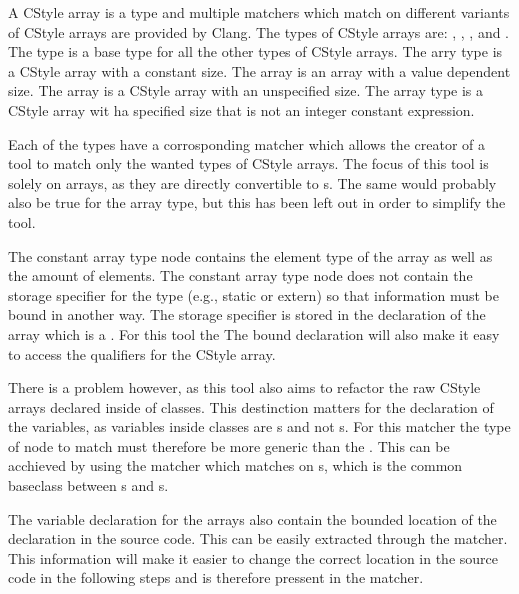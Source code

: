 A CStyle array is a type and multiple matchers which match on different variants of CStyle arrays are provided by Clang. The types of CStyle arrays are: , , ,  and . \\
The  type is a base type for all the other types of CStyle arrays. The  arry type is a CStyle array with a constant size. The  array is an array with a value dependent size. The  array is a CStyle array with an unspecified size. The  array type is a CStyle array wit ha specified size that is not an integer constant expression.

Each of the types have a corrosponding matcher which allows the creator of a tool to match only the wanted types of CStyle arrays. The focus of this tool is solely on  arrays, as they are directly convertible to s. The same would probably also be true for the  array type, but this has been left out in order to simplify the tool.

The constant array type node contains the element type of the array as well as the amount of elements. The constant array type node does not contain the storage specifier for the type (e.g., static or extern) so that information must be bound in another way. The storage specifier is stored in the declaration of the array which is a . For this tool the  The bound declaration will also make it easy to access the qualifiers for the CStyle array. 

There is a problem however, as this tool also aims to refactor the raw CStyle arrays declared inside of classes. This destinction matters for the declaration of the variables, as variables inside classes are s and not s. For this matcher the type of node to match must therefore be more generic than the . This can be acchieved by using the  matcher which matches on s, which is the common baseclass between s and s.

The variable declaration for the arrays also contain the bounded location of the declaration in the source code. This can be easily extracted through the  matcher. This information will make it easier to change the correct location in the source code in the following steps and is therefore pressent in the matcher.

